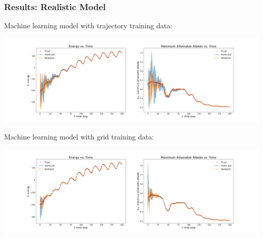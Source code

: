 \documentclass{beamer}
\begin{document}
\begin{frame}
\frametitle{Results: Realistic Model}
{\setlength{\baselineskip}{0.001em}
\tiny{Machine learning model with trajectory training data:}
\begin{center}
\includegraphics[width=0.85\linewidth]{Figures/H_ml_hat_new.png} 
\end{center}
\tiny{Machine learning model with grid training data:}
\begin{center}
\includegraphics[width=0.85\linewidth]{Figures/H_ml_hat_grid_new.png} 
\end{center}
}
\end{frame}
\end{document}
